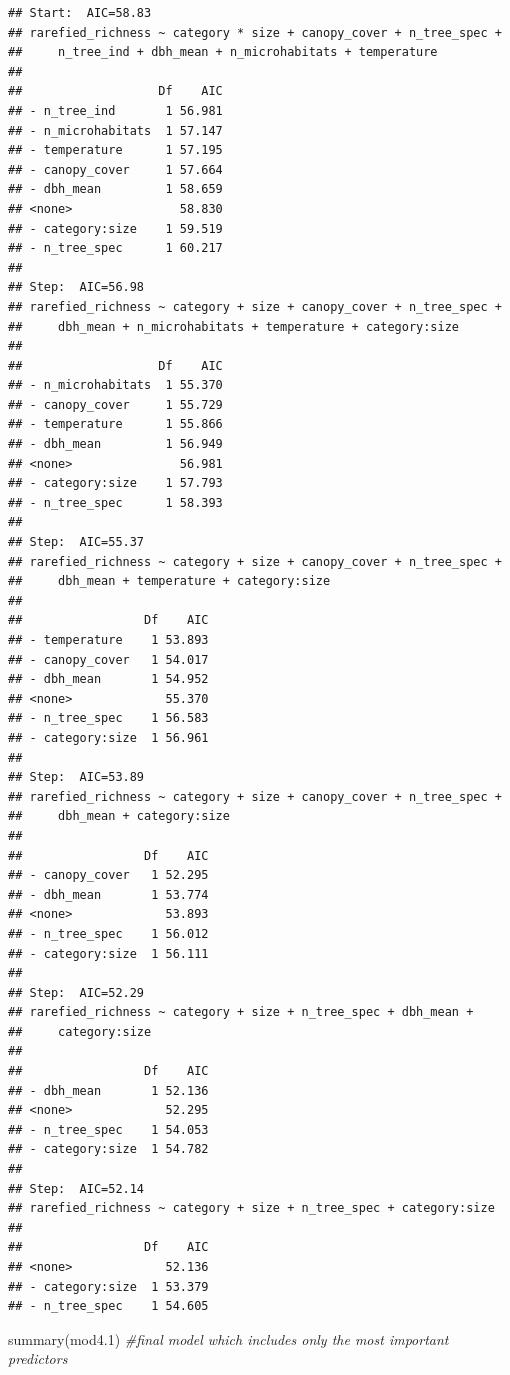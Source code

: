 \documentclass[
]{article}
\newenvironment{Shaded}{\begin{snugshade}}{\end{snugshade}}
\newcommand{\CommentTok}[1]{\textcolor[rgb]{0.56,0.35,0.01}{\textit{#1}}}
\newcommand{\FloatTok}[1]{\textcolor[rgb]{0.00,0.00,0.81}{#1}}
\newcommand{\FunctionTok}[1]{\textcolor[rgb]{0.00,0.00,0.00}{#1}}
\newcommand{\NormalTok}[1]{#1}
\begin{document}
\begin{verbatim}
## Start:  AIC=58.83
## rarefied_richness ~ category * size + canopy_cover + n_tree_spec + 
##     n_tree_ind + dbh_mean + n_microhabitats + temperature
## 
##                   Df    AIC
## - n_tree_ind       1 56.981
## - n_microhabitats  1 57.147
## - temperature      1 57.195
## - canopy_cover     1 57.664
## - dbh_mean         1 58.659
## <none>               58.830
## - category:size    1 59.519
## - n_tree_spec      1 60.217
## 
## Step:  AIC=56.98
## rarefied_richness ~ category + size + canopy_cover + n_tree_spec + 
##     dbh_mean + n_microhabitats + temperature + category:size
## 
##                   Df    AIC
## - n_microhabitats  1 55.370
## - canopy_cover     1 55.729
## - temperature      1 55.866
## - dbh_mean         1 56.949
## <none>               56.981
## - category:size    1 57.793
## - n_tree_spec      1 58.393
## 
## Step:  AIC=55.37
## rarefied_richness ~ category + size + canopy_cover + n_tree_spec + 
##     dbh_mean + temperature + category:size
## 
##                 Df    AIC
## - temperature    1 53.893
## - canopy_cover   1 54.017
## - dbh_mean       1 54.952
## <none>             55.370
## - n_tree_spec    1 56.583
## - category:size  1 56.961
## 
## Step:  AIC=53.89
## rarefied_richness ~ category + size + canopy_cover + n_tree_spec + 
##     dbh_mean + category:size
## 
##                 Df    AIC
## - canopy_cover   1 52.295
## - dbh_mean       1 53.774
## <none>             53.893
## - n_tree_spec    1 56.012
## - category:size  1 56.111
## 
## Step:  AIC=52.29
## rarefied_richness ~ category + size + n_tree_spec + dbh_mean + 
##     category:size
## 
##                 Df    AIC
## - dbh_mean       1 52.136
## <none>             52.295
## - n_tree_spec    1 54.053
## - category:size  1 54.782
## 
## Step:  AIC=52.14
## rarefied_richness ~ category + size + n_tree_spec + category:size
## 
##                 Df    AIC
## <none>             52.136
## - category:size  1 53.379
## - n_tree_spec    1 54.605
\end{verbatim}

\begin{Shaded}
\begin{Highlighting}[]
\FunctionTok{summary}\NormalTok{(mod4}\FloatTok{.1}\NormalTok{) }\CommentTok{\#final model which includes only the most important predictors }
\end{Highlighting}
\end{Shaded}
\end{document}
